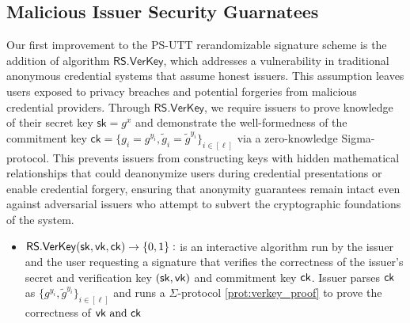 \subsection{Malicious Issuer Security Guarnatees}\label{subsec:malicious_issuer_security_guarantee}
Our first improvement to the PS-UTT rerandomizable signature scheme is the addition of algorithm $\mathsf{RS.VerKey}$, which addresses a vulnerability in traditional anonymous credential systems that assume honest issuers. This assumption leaves users exposed to privacy breaches and potential forgeries from malicious credential providers. Through $\mathsf{RS.VerKey}$, we require issuers to prove knowledge of their secret key $\mathsf{sk} = g^x$ and demonstrate the well-formedness of the commitment key $\mathsf{ck} = \{g_i = g^{y_i}, \tilde{g}_i = \tilde{g}^{y_i}\}_{i \in [\ell]}$ via a zero-knowledge Sigma-protocol. This prevents issuers from constructing keys with hidden mathematical relationships that could deanonymize users during credential presentations or enable credential forgery, ensuring that anonymity guarantees remain intact even against adversarial issuers who attempt to subvert the cryptographic foundations of the system.

\begin{itemize}
        \item $\mathsf{RS.VerKey}(\mathsf{sk}, \mathsf{vk}, \mathsf{ck}) \to \{0,1\}:$ is an interactive algorithm run by the issuer and the user requesting a signature that verifies the correctness of the issuer's secret and verification key $(\mathsf{sk}, \mathsf{vk})$ and commitment key $\mathsf{ck}$. Issuer parses $\mathsf{ck}$ as $\{g^{y_i}, \tilde{g}^{y_i}\}_{i \in  [\ell]}$ and runs a $\Sigma$-protocol \ref{prot:verkey_proof} to prove the correctness of $\mathsf{vk}\text{ and } \mathsf{ck}$
\end{itemize}

